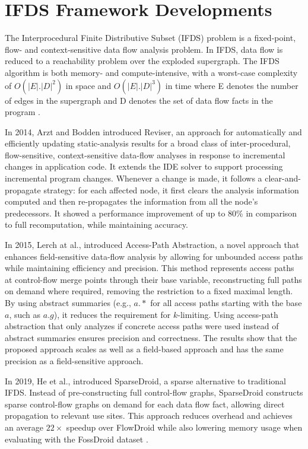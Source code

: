 \section*{IFDS Framework Developments}


The Interprocedural Finite Distributive Subset (IFDS) problem is a fixed-point, flow- and context-sensitive data flow analysis problem. 
In IFDS, data flow is reduced to a reachability problem over the exploded supergraph. The IFDS algorithm is both memory- and compute-intensive, with a worst-case complexity of
$O(|E| . |D|^2)$ in space and $O(|E| . |D|^3)$ in time where E denotes the number of edges in the supergraph and D denotes the set of data flow facts in the program \cite{reps1995precise}.

In 2014, Arzt and Bodden introduced Reviser, an approach for automatically and efficiently updating static-analysis results for a broad class of inter-procedural, flow-sensitive, context-sensitive data-flow analyses in response to incremental changes in application code. It extends the IDE solver to support processing incremental program changes. Whenever a change is made, it follows a clear-and-propagate strategy: for each affected node, it first clears the analysis information computed and then re-propagates the information from all the node’s predecessors. It showed a performance improvement of up to 80\% in comparison to full recomputation, while maintaining accuracy.

In 2015, Lerch at al., introduced Access-Path Abstraction, a novel approach that enhances field-sensitive data-flow analysis by allowing for unbounded access paths while maintaining efficiency and precision. This method represents access paths at control-flow merge points through their base variable, reconstructing full paths on demand where required, removing the restriction to a fixed maximal length. By using abstract summaries (e.g., $a.*$ for all access paths starting with the base $a$, such as $a.g$), it reduces the requirement for $k$-limiting. Using access-path abstraction that only analyzes if concrete access paths were used instead of abstract summaries ensures precision and correctness. The results show that the proposed approach scales as well as a field-based approach and has the same precision as a field-sensitive approach.

In 2019, He et al., introduced SparseDroid, a sparse alternative to traditional IFDS. Instead of pre-constructing full control-flow graphs, SparseDroid constructs sparse control-flow graphs on demand for each data flow fact, allowing direct propagation to relevant use sites. This approach reduces overhead and achieves an average $22\times$ speedup over FlowDroid while also lowering memory usage when evaluating with the FossDroid dataset \cite{fossdroid}.

